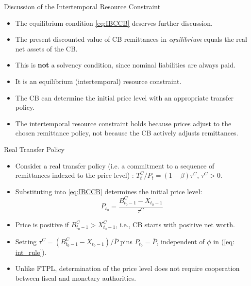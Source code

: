 \documentclass[11pt,aspectratio=169]{beamer}
\begin{document}
\begin{frame}{Discussion of the Intertemporal Resource Constraint}
\begin{itemize}
    \item The equilibrium condition \eqref{eq:IBCCB} deserves further discussion.
    \vspace{0.25cm}
    \item The present discounted value of CB remittances in \textit{equilibrium} equals the real net assets of the CB.
\vspace{0.25cm}
\item This is \textbf{not} a solvency condition, since nominal liabilities are always paid.
\vspace{0.25cm}
\item It is an equilibrium (intertemporal) resource constraint.

\vspace{0.25cm}
\item The CB can determine the initial price level with an appropriate transfer policy.

\vspace{0.25cm}
\item The intertemporal resource constraint holds because prices adjust to the chosen remittance policy, not because the CB actively adjusts remittances.

\end{itemize}
\end{frame}

\begin{frame}{Real Transfer Policy}
\begin{itemize}
    \item Consider a real transfer policy (i.e. a commitment to a sequence of remittances indexed to the price level) : $T_t^C / P_t = (1-\beta) \tau^C$, $\tau^C>0$.
    \vspace{0.25cm}
    \item Substituting into \eqref{eq:IBCCB} determines the initial price level:
    \begin{equation} \label{PdetC}
        P_{t_0} = \frac{B_{t_0-1}^C - X_{t_0-1}}{\tau^C}
    \end{equation}
    \vspace{0.25cm}
    \item Price is positive if $B_{t_0-1}^C > X_{t_0-1}^C$, i.e., CB starts with positive net worth.
    \item Setting $\tau^C = (B_{t_0-1}^C - X_{t_0-1}) / \bar P$ pins $P_{t_0} = \bar P$, independent of $\phi$ in (\ref{eq: int_rule}).
    \vspace{0.25cm}
    \item Unlike FTPL, determination of the price level does not require cooperation between fiscal and monetary authorities.
\end{itemize}
\end{frame}
\end{document}
